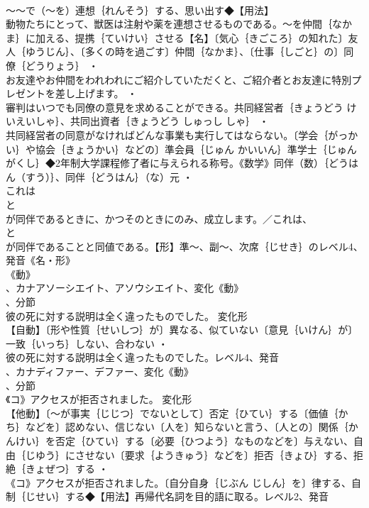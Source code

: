\documentclass[8pt]{extreport}
\begin{document}
\begin{CJK}{UTF8}{min}
\\	～～で（～を）連想｛れんそう｝する、思い出す◆【用法】
\\	動物たちにとって、獣医は注射や薬を連想させるものである。～を仲間｛なかま｝に加える、提携｛ていけい｝させる【名】〔気心｛きごころ｝の知れた〕友人｛ゆうじん｝、〔多くの時を過ごす〕仲間｛なかま｝、〔仕事｛しごと｝の〕同僚｛どうりょう｝ ・
\\	お友達やお仲間をわれわれにご紹介していただくと、ご紹介者とお友達に特別プレゼントを差し上げます。 ・
\\	審判はいつでも同僚の意見を求めることができる。共同経営者｛きょうどう けいえいしゃ｝、共同出資者｛きょうどう しゅっし しゃ｝ ・
\\	共同経営者の同意がなければどんな事業も実行してはならない。〔学会｛がっかい｝や協会｛きょうかい｝などの〕準会員｛じゅん かいいん｝準学士｛じゅんがくし｝◆2年制大学課程修了者に与えられる称号。《数学》同伴（数）｛どうはん（すう）｝、同伴｛どうはん｝（な）元 ・
\\	これは
\\	と
\\	が同伴であるときに、かつそのときにのみ、成立します。／これは、
\\	と
\\	が同伴であることと同値である。【形】準～、副～、次席｛じせき｝のレベル4、発音《名・形》
\\	《動》
\\	、カナアソーシエイト、アソウシエイト、変化《動》
\\	、分節
\\	彼の死に対する説明は全く違ったものでした。	変化形 
\\	【自動】〔形や性質｛せいしつ｝が〕異なる、似ていない〔意見｛いけん｝が〕一致｛いっち｝しない、合わない ・
\\	彼の死に対する説明は全く違ったものでした。レベル4、発音
\\	、カナディファー、デファー、変化《動》
\\	、分節
\\	《コ》アクセスが拒否されました。	変化形 
\\	【他動】〔～が事実｛じじつ｝でないとして〕否定｛ひてい｝する〔価値｛かち｝などを〕認めない、信じない〔人を〕知らないと言う、〔人との〕関係｛かんけい｝を否定｛ひてい｝する〔必要｛ひつよう｝なものなどを〕与えない、自由｛じゆう｝にさせない〔要求｛ようきゅう｝などを〕拒否｛きょひ｝する、拒絶｛きょぜつ｝する ・
\\	《コ》アクセスが拒否されました。〔自分自身｛じぶん じしん｝を〕律する、自制｛じせい｝する◆【用法】再帰代名詞を目的語に取る。レベル2、発音

\end{CJK}
\end{document}
